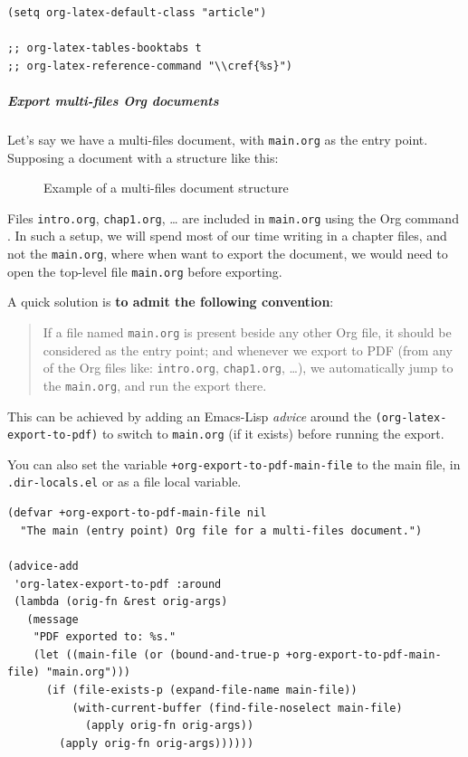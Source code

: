 \documentclass[11pt]{article}
\begin{document}
\begin{verbatim}
(setq org-latex-default-class "article")

;; org-latex-tables-booktabs t
;; org-latex-reference-command "\\cref{%s}")
\end{verbatim}

\subparagraph{Export multi-files Org documents}
\label{sec:org8732a9a}
Let's say we have a multi-files document, with \texttt{main.org} as the entry point.
Supposing a document with a structure like this:

\begin{figure}[htbp]
\centering

\caption{Example of a multi-files document structure}
\end{figure}

Files \texttt{intro.org}, \texttt{chap1.org}, \ldots{} are included in \texttt{main.org} using the Org command
. In such a setup, we will spend most of our time
writing in a chapter files, and not the \texttt{main.org}, where when want to export the
document, we would need to open the top-level file \texttt{main.org} before exporting.

A quick solution is \textbf{to admit the following convention}:

\begin{quote}
If a file named \texttt{main.org} is present beside any other Org file, it should be
considered as the entry point; and whenever we export to PDF (from any of the
Org files like: \texttt{intro.org}, \texttt{chap1.org}, \ldots{}), we automatically jump to the
\texttt{main.org}, and run the export there.
\end{quote}

This can be achieved by adding an Emacs-Lisp \emph{advice} around the
\texttt{(org-latex-export-to-pdf)} to switch to \texttt{main.org} (if it exists) before
running the export.

You can also set the variable \texttt{+org-export-to-pdf-main-file} to the main file, in
\texttt{.dir-locals.el} or as a file local variable.

\begin{verbatim}
(defvar +org-export-to-pdf-main-file nil
  "The main (entry point) Org file for a multi-files document.")

(advice-add
 'org-latex-export-to-pdf :around
 (lambda (orig-fn &rest orig-args)
   (message
    "PDF exported to: %s."
    (let ((main-file (or (bound-and-true-p +org-export-to-pdf-main-file) "main.org")))
      (if (file-exists-p (expand-file-name main-file))
          (with-current-buffer (find-file-noselect main-file)
            (apply orig-fn orig-args))
        (apply orig-fn orig-args))))))
\end{verbatim}
\end{document}
